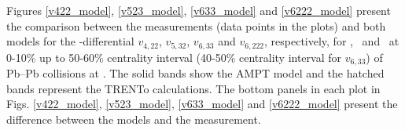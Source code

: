 \documentclass[ALICE,manyauthors]{cernphprep}
\begin{document}


Figures \ref{v422_model}, \ref{v523_model}, \ref{v633_model} and \ref{v6222_model} present the comparison between the measurements (data points in the plots) and both models for the \pT-differential $v_{4,22}$, $v_{5,32}$, $v_{6,33}$ and $v_{6,222}$, respectively, for \pion, \kaon~and \proton~at 0-10\% up to 50-60\% centrality interval (40-50\% centrality interval for $v_{6,33}$) of Pb--Pb collisions at \sNN. The solid bands show the AMPT model and the hatched bands represent the TRENTo calculations. The bottom panels in each plot in Figs. \ref{v422_model}, \ref{v523_model}, \ref{v633_model} and \ref{v6222_model} present the difference between the models and the measurement. 
\end{document}
